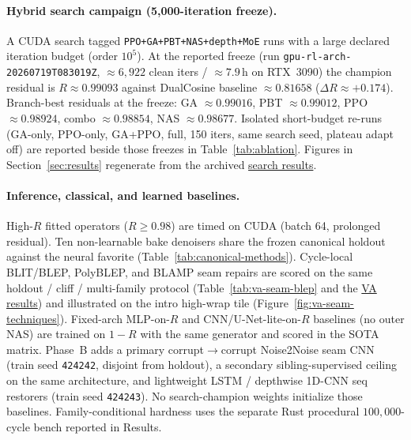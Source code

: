 \paragraph{Hybrid search campaign (5,000-iteration freeze).}
A CUDA search tagged \texttt{PPO+GA+PBT+NAS+depth+MoE} runs with a large declared iteration budget (order $10^{5}$).
At the reported freeze (run \texttt{gpu-rl-arch-20260719T083019Z}, $\approx 6{,}922$ clean iters / $\approx 7.9$\,h on RTX~3090) the champion residual is $R\approx 0.99093$ against DualCosine baseline $\approx 0.81658$ ($\Delta R\approx{+}0.174$).
Branch-best residuals at the freeze: GA $\approx 0.99016$, PBT $\approx 0.99012$, PPO $\approx 0.98924$, combo $\approx 0.98854$, NAS $\approx 0.98677$.
Isolated short-budget re-runs (GA-only, PPO-only, GA{+}PPO, full, 150 iters, same search seed, plateau adapt off) are reported beside those freezes in Table~\ref{tab:ablation}.
Figures in Section~\ref{sec:results} regenerate from the archived \href{https://github.com/reeldemo/denoise-opt-meta/blob/master/paper/Unsupervised_Wrap-Discontinuity_Repair_in_Wavetable_Synthesis_via_Hybrid_GA-PPO_Meta-Search_v12/figures/meta_approach_compare_v10.json}{search results}.

\paragraph{Inference, classical, and learned baselines.}
High-$R$ fitted operators ($R\ge 0.98$) are timed on CUDA (batch 64, prolonged residual).
Ten non-learnable bake denoisers share the frozen canonical holdout against the neural favorite (Table~\ref{tab:canonical-methods}).
Cycle-local BLIT/BLEP, PolyBLEP, and BLAMP seam repairs are scored on the same holdout / cliff / multi-family protocol (Table~\ref{tab:va-seam-blep} and the \href{https://github.com/reeldemo/denoise-opt-meta/blob/master/paper/Unsupervised_Wrap-Discontinuity_Repair_in_Wavetable_Synthesis_via_Hybrid_GA-PPO_Meta-Search_v12/figures/va_seam_blep.json}{VA results}) and illustrated on the intro high-wrap tile (Figure~\ref{fig:va-seam-techniques}).
Fixed-arch MLP-on-$R$ and CNN/U-Net-lite-on-$R$ baselines (no outer NAS) are trained on $1{-}R$ with the same generator and scored in the SOTA matrix.
Phase~B adds a primary corrupt$\to$corrupt Noise2Noise seam CNN (train seed \texttt{424242}, disjoint from holdout), a secondary sibling-supervised ceiling on the same architecture, and lightweight LSTM / depthwise 1D-CNN seq restorers (train seed \texttt{424243}).
No search-champion weights initialize those baselines.
Family-conditional hardness uses the separate Rust procedural $100{,}000$-cycle bench reported in Results.

